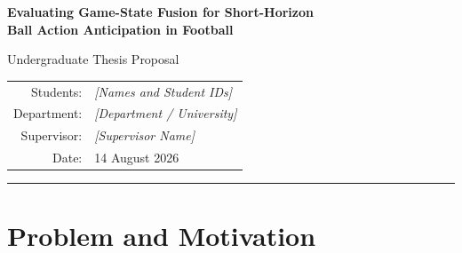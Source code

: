 \documentclass[11pt,a4paper]{article}
\newcommand{\placeholder}[1]{\textit{[#1]}}
\begin{document}
\begin{center}
{\Large\bfseries Evaluating Game-State Fusion for Short-Horizon\\[2pt] Ball Action Anticipation in Football}\par
\vspace{0.45em}
{\large Undergraduate Thesis Proposal}\par
\vspace{1.0em}
\begin{tabular}{rl}
Students: & \placeholder{Names and Student IDs}\\
Department: & \placeholder{Department / University}\\
Supervisor: & \placeholder{Supervisor Name}\\
Date: & 14 August 2026
\end{tabular}
\end{center}
\vspace{0.35em}
\hrule
\vspace{0.6em}

\begin{abstract}
The present inquiry concerns a simple but consequential question: whether an explicit description of the state of a football match can improve the anticipation of actions that have not yet occurred. Ball Action Anticipation (BAA) has recently been formalised in SoccerNet, where a model observes past video and predicts the class and time of ball-related actions in an unseen future interval \cite{dalal2025faantra,cioppa2026}. Existing BAA systems are chiefly visual, while separate work has shown that player positions, velocities, team relations, and longer game context can assist action detection when the action itself is already observable \cite{ochin2025gs,ochin2025beyond}. This proposal therefore studies whether synchronized player game state contributes predictive information in the harder anticipation setting. SoccerTrack v2 is selected because it publicly provides full-pitch panoramic video, Game State Reconstruction (GSR), and Ball Action Spotting (BAS) annotations for ten complete matches \cite{scott2025}. The proposed study compares visual-only, game-state-only, simple-fusion, and relation-aware models under a common evaluation protocol, with particular care given to data alignment, release quality, computational economy, and reproducibility.
\end{abstract}

\section{Problem and Motivation}
\end{document}

